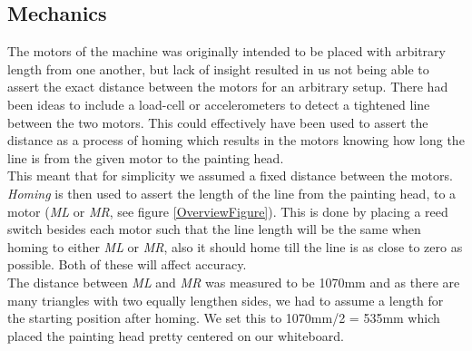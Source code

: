 \subsection{Mechanics}
The motors of the machine was originally intended to be placed with arbitrary length from one another, but lack of insight resulted in us not being able to assert the exact distance between the motors for an arbitrary setup. There had been ideas to include a load-cell or accelerometers to detect a tightened line between the two motors. This could effectively have been used to assert the distance as a process of homing which results in the motors knowing how long the line is from the given motor to the painting head.\\
This meant that for simplicity we assumed a fixed distance between the motors. {\it Homing} is then used to assert the length of the line from the painting head, to a motor ({\it ML} or {\it MR}, see figure \ref{OverviewFigure}). This is done by placing a reed switch besides each motor such that the line length will be the same when homing to either {\it ML} or {\it MR}, also it should home till the line is as close to zero as possible. Both of these will affect accuracy.\\
The distance between {\it ML} and {\it MR} was measured to be 1070mm and as there are many triangles with two equally lengthen sides, we had to assume a length for the starting position after homing. We set this to 1070mm/2 = 535mm which placed the painting head pretty centered on our whiteboard. 

